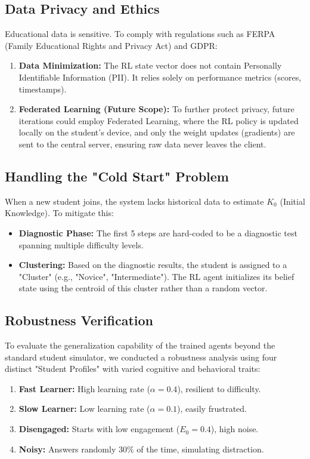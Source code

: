 \documentclass[conference]{IEEEtran}
\begin{document}
\subsection{Data Privacy and Ethics}
Educational data is sensitive. To comply with regulations such as FERPA (Family Educational Rights and Privacy Act) and GDPR:
\begin{enumerate}
    \item \textbf{Data Minimization:} The RL state vector does not contain Personally Identifiable Information (PII). It relies solely on performance metrics (scores, timestamps).
    \item \textbf{Federated Learning (Future Scope):} To further protect privacy, future iterations could employ Federated Learning, where the RL policy is updated locally on the student's device, and only the weight updates (gradients) are sent to the central server, ensuring raw data never leaves the client.
\end{enumerate}


\subsection{Handling the "Cold Start" Problem}
When a new student joins, the system lacks historical data to estimate $K_0$ (Initial Knowledge). To mitigate this:
\begin{itemize}
    \item \textbf{Diagnostic Phase:} The first 5 steps are hard-coded to be a diagnostic test spanning multiple difficulty levels.
    \item \textbf{Clustering:} Based on the diagnostic results, the student is assigned to a "Cluster" (e.g., "Novice", "Intermediate"). The RL agent initializes its belief state using the centroid of this cluster rather than a random vector.
\end{itemize}

\subsection{Robustness Verification}
To evaluate the generalization capability of the trained agents beyond the standard student simulator, we conducted a robustness analysis using four distinct "Student Profiles" with varied cognitive and behavioral traits:
\begin{enumerate}
    \item \textbf{Fast Learner:} High learning rate ($\alpha=0.4$), resilient to difficulty.
    \item \textbf{Slow Learner:} Low learning rate ($\alpha=0.1$), easily frustrated.
    \item \textbf{Disengaged:} Starts with low engagement ($E_0=0.4$), high noise.
    \item \textbf{Noisy:} Answers randomly 30\% of the time, simulating distraction.
\end{enumerate}
\end{document}
